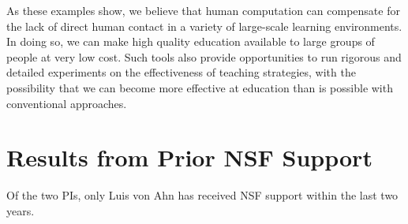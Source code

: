 \documentclass[12pt]{article}
\begin{document}
As these examples show, we believe that human computation can
compensate for the lack of direct human contact in a variety of
large-scale learning environments.  In doing so, we can make high
quality education available to large groups of people at very low
cost.  Such tools also provide opportunities to run rigorous and
detailed experiments on the effectiveness of teaching strategies, with
the possibility that we can become more effective at education than is
possible with conventional approaches.

\section{Results from Prior NSF Support}

Of the two PIs, only Luis von Ahn has received NSF support within the
last two years.


\newpage


\end{document}
